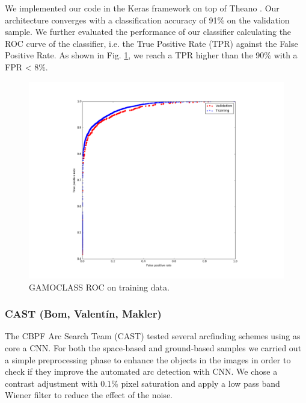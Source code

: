 \documentclass{aa}
\begin{document}
We implemented our code in the Keras framework \citep{Chollet_2015} on top of Theano \citep{Bastien_2012}.
Our architecture converges with a classification accuracy of 91\% on the validation sample. We further evaluated the performance of our classifier calculating the ROC curve of the classifier, i.e. the True Positive Rate (TPR) against the False Positive Rate. As shown in Fig. \ref{Fig2_gamoclass}, we reach a TPR higher than the 90\% with a FPR < 8\%.

\begin{figure}
  \centering
      \includegraphics[width=1\columnwidth]{figures/Fig2_gamoclass.pdf} 
  \caption{GAMOCLASS ROC on training data.}
 \label{Fig2_gamoclass}
\end{figure}


\subsubsection{CAST (Bom, Valent\'in, Makler)}

The CBPF Arc Search Team (CAST) tested several arcfinding schemes using as core a CNN. For both the space-based and ground-based samples we carried out a simple preprocessing phase to enhance the objects in the images in order to check if they improve the automated arc detection with CNN. We chose a contrast adjustment with $0.1\%$ pixel saturation and apply a low pass band Wiener filter \citep{wiener1964extrapolation} to reduce the effect of the noise. 
\end{document}
